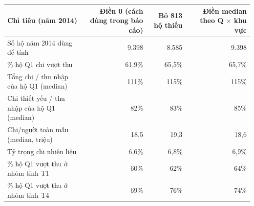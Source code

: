 \begin{tabular}{lrrr}
\toprule
Chỉ tiêu (năm 2014) & Điền 0 (cách dùng trong báo cáo) & Bỏ 813 hộ thiếu & Điền median theo Q $\times$ khu vực \\
\midrule
Số hộ năm 2014 dùng để tính & 9.398 & 8.585 & 9.398 \\
\% hộ Q1 chi vượt thu & 61,9\% & 65,5\% & 65,7\% \\
Tổng chi / thu nhập của hộ Q1 (median) & 111\% & 115\% & 115\% \\
Chi thiết yếu / thu nhập của hộ Q1 (median) & 82\% & 83\% & 85\% \\
Chi/người toàn mẫu (median, triệu) & 18,5 & 19,3 & 18,6 \\
Tỷ trọng chi nhiên liệu & 6,6\% & 6,8\% & 6,9\% \\
\% hộ Q1 vượt thu ở nhóm tỉnh T1 & 60\% & 62\% & 64\% \\
\% hộ Q1 vượt thu ở nhóm tỉnh T4 & 69\% & 76\% & 74\% \\
\bottomrule
\end{tabular}
